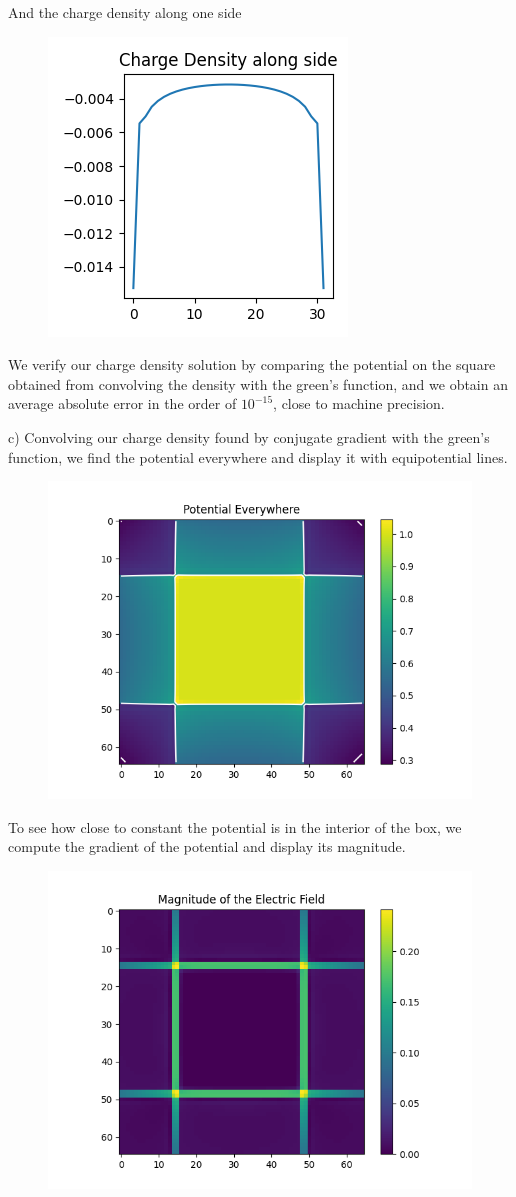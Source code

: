 \documentclass[]{article}
\begin{document}
And the charge density along one side

\begin{figure}[h!]
	\centering
	\includegraphics[width=0.25\linewidth]{../Results/2b2.png}
\end{figure}

We verify our charge density solution by comparing the potential on the square obtained from convolving the density with the green's function, and we obtain an average absolute error in the order of $10^{-15}$, close to machine precision.

\newpage

c)
Convolving our charge density found by conjugate gradient with the green's function, we find the potential everywhere and display it with equipotential lines.

\begin{figure}[h!]
	\centering
	\includegraphics[width=0.5\linewidth]{../Results/2c1.png}
\end{figure}

To see how close to constant the potential is in the interior of the box, we compute the gradient of the potential and display its magnitude.

\begin{figure}[h!]
	\centering
	\includegraphics[width=0.5\linewidth]{../Results/2c2.png}
\end{figure}
\end{document}
